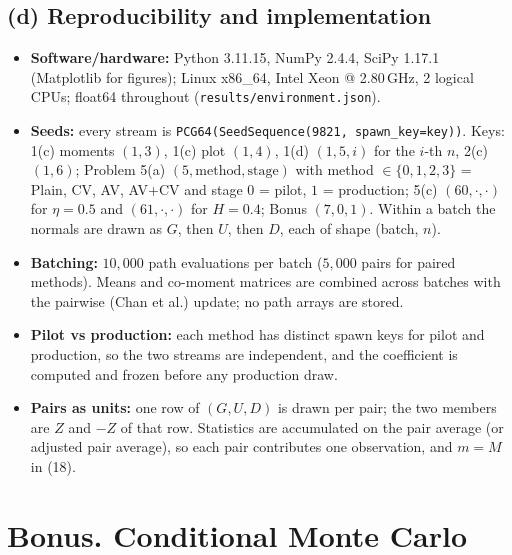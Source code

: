 \documentclass[10pt]{article}
\begin{document}
\subsection*{(d) Reproducibility and implementation}
\begin{itemize}\itemsep0pt
\item \textbf{Software/hardware:} Python 3.11.15, NumPy 2.4.4, SciPy 1.17.1 (Matplotlib for figures);
Linux x86\_64, Intel Xeon @ 2.80\,GHz, 2 logical CPUs; float64 throughout
(\texttt{results/environment.json}).
\item \textbf{Seeds:} every stream is \texttt{PCG64(SeedSequence(9821, spawn\_key=key))}. Keys: 1(c)
moments $(1,3)$, 1(c) plot $(1,4)$, 1(d) $(1,5,i)$ for the $i$-th $n$, 2(c) $(1,6)$; Problem 5(a)
$(5,\text{method},\text{stage})$ with method $\in\{0,1,2,3\}$ = Plain, CV, AV, AV+CV and stage $0$ =
pilot, $1$ = production; 5(c) $(60,\cdot,\cdot)$ for $\eta=0.5$ and $(61,\cdot,\cdot)$ for $H=0.4$;
Bonus $(7,0,1)$. Within a batch the normals are drawn as $G$, then $U$, then $D$, each of shape
(batch, $n$).
\item \textbf{Batching:} $10{,}000$ path evaluations per batch ($5{,}000$ pairs for paired methods).
Means and co-moment matrices are combined across batches with the pairwise (Chan et al.) update;
no path arrays are stored.
\item \textbf{Pilot vs production:} each method has distinct spawn keys for pilot and production,
so the two streams are independent, and the coefficient is computed and frozen before any
production draw.
\item \textbf{Pairs as units:} one row of $(G,U,D)$ is drawn per pair; the two members are $Z$ and $-Z$
of that row. Statistics are accumulated on the pair average (or adjusted pair average), so each pair
contributes one observation, and $m=M$ in (18).
\end{itemize}

\section*{Bonus. Conditional Monte Carlo}
\end{document}
